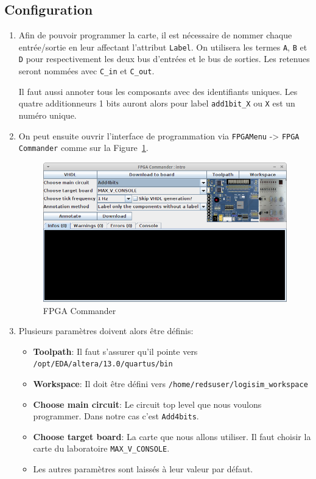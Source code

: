 \documentclass[nosolution]{exercice}
\begin{document}
\subsection{Configuration}
\begin{enumerate}
\item Afin de pouvoir programmer la carte, il est nécessaire de nommer chaque entrée/sortie en leur affectant
l'attribut \texttt{Label}. On utilisera les termes \texttt{A}, \texttt{B} et \texttt{D} pour respectivement les deux bus
d'entrées et le bus de sorties. Les retenues seront nommées avec \texttt{C\_in} et \texttt{C\_out}.

Il faut aussi annoter tous les composants avec des identifiants uniques. Les quatre additionneurs 1 bits auront alors pour
label \texttt{add1bit\_X} ou \texttt{X} est un numéro unique.

\item On peut ensuite ouvrir l'interface de programmation via \texttt{FPGAMenu} -> \texttt{FPGA Commander}
comme sur la Figure~\ref{fig_FPGACommander}.

\begin{figure}[H]
\begin{center}
\includegraphics[scale=0.45]{images/logisim_fpgaCommander.png}
\caption{\label{fig_FPGACommander}FPGA Commander}
\end{center}
\end{figure}

\item Plusieurs paramètres doivent alors être définis:
\begin{itemize}
\item \textbf{Toolpath}: Il faut s'assurer qu'il pointe vers\\ \texttt{/opt/EDA/altera/13.0/quartus/bin}
\item \textbf{Workspace}: Il doit être défini vers \texttt{/home/redsuser/logisim\_workspace} %
\item \textbf{Choose main circuit}: Le circuit top level que nous voulons programmer. Dans notre cas c'est
\texttt{Add4bits}.
\item \textbf{Choose target board}: La carte que nous allons utiliser. Il faut choisir la carte du laboratoire
\texttt{MAX\_V\_CONSOLE}.
\item Les autres paramètres sont laissés à leur valeur par défaut.
\end{itemize}


\end{enumerate}
\end{document}

